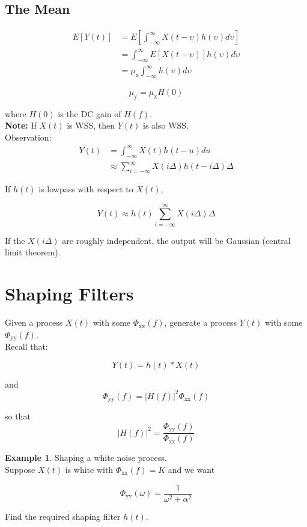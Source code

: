 \documentclass[12pt]{book}
\theoremstyle{definition}
\newtheorem{exmp}{Example}[chapter]
\begin{document}
\subsection{The Mean}

\[
\begin{split}
    E[Y(t)] & = E \left [ \int_{-\infty}^\infty X(t-\upsilon) h(\upsilon) d \upsilon \right ]\\
                & =  \int_{-\infty}^\infty E \left [ X(t-\upsilon) \right ] h(\upsilon) d \upsilon \\
                & =  \mu_\mathrm{x} \int_{-\infty}^\infty  h(\upsilon) d \upsilon
\end{split}
\]

\[
\boxed{\mu_\mathrm{y}  = \mu_\mathrm{x} H(0)}
\]

where \(H(0)\) is the DC gain of \(H(f)\). \\


\textbf{Note:} If \(X(t)\) is WSS, then \(Y(t)\) is also WSS.\\

Observation:
\[
\begin{split}
    Y(t) & = \int_{-\infty}^{\infty} X(t) h(t-u) du\\
        & \approx \sum_{i=-\infty}^\infty X(i \Delta) h(t-i \Delta) \Delta
\end{split}
\]

 If \(h(t)\) is lowpass with respect to \(X(t)\),

\[
Y(t) \approx h(t) \sum_{i=-\infty}^\infty X(i \Delta)  \Delta
\]

If the \(X(i \Delta)\) are roughly independent, the output will be Gaussian (central limit theorem).  

\section{Shaping Filters}

Given a process \(X(t)\) with some \(\Phi_\mathrm{xx}(f)\), generate a process
\(Y(t)\) with some \(\Phi_\mathrm{yy}(f)\).\\

Recall that:

\[ Y(t) = h(t) \ast X(t) \]

and 
\[ \Phi_\mathrm{yy}(f) = |H(f)|^2 \Phi_\mathrm{xx}(f) \]

so that
\[ |H(f)|^2 = \frac {\Phi_\mathrm{yy}(f)} {\Phi_\mathrm{xx}(f)} \]

\begin{tcolorbox}
    
\begin{exmp}{Shaping a white noise process.}\\
Suppose \(X(t)\) is white with \(\Phi_\mathrm{xx}(f) = K\) and we want

\[
\Phi_\mathrm{yy}(\omega) = \frac{1}{\omega^2 + \alpha^2}
\]

Find the required shaping filter \(h(t)\).

\end{exmp}
\end{tcolorbox}
\end{document}
